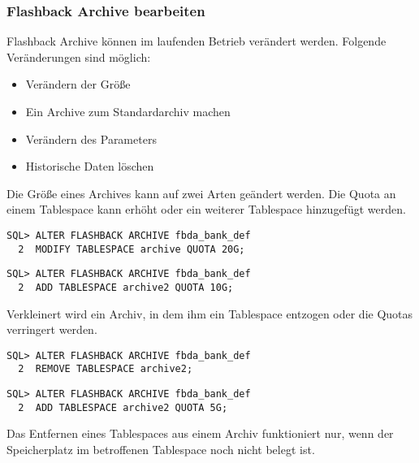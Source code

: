        \subsubsection{Flashback Archive bearbeiten}
          Flashback Archive k\"onnen im laufenden Betrieb ver\"andert werden. Folgende Ver\"anderungen sind m\"oglich:
          \begin{itemize}
            \item Ver\"andern der Gr\"o\ss{}e
            \item Ein Archive zum Standardarchiv machen
            \item Ver\"andern des Parameters 
            \item Historische Daten l\"oschen
          \end{itemize}
          Die Gr\"o\ss{}e eines Archives kann auf zwei Arten ge\"andert werden. Die Quota an einem Tablespace kann erh\"oht oder ein weiterer Tablespace hinzugef\"ugt werden.
          \begin{lstlisting}[caption={Die Quota eines Archives auf 20GB erh\"ohen},label=admin1734,language=oracle_sql]
SQL> ALTER FLASHBACK ARCHIVE fbda_bank_def
  2  MODIFY TABLESPACE archive QUOTA 20G;
          \end{lstlisting}
          \begin{lstlisting}[caption={Dem Archiv einen weiteren Tablespace hinzuf\"ugen},label=admin1735,language=oracle_sql]
SQL> ALTER FLASHBACK ARCHIVE fbda_bank_def
  2  ADD TABLESPACE archive2 QUOTA 10G;
          \end{lstlisting}
          Verkleinert wird ein Archiv, in dem ihm ein Tablespace entzogen oder die Quotas verringert werden.
          \begin{lstlisting}[caption={Einen Tablespace aus dem Archiv entfernen},label=admin1736,language=oracle_sql]
SQL> ALTER FLASHBACK ARCHIVE fbda_bank_def
  2  REMOVE TABLESPACE archive2;
          \end{lstlisting}
          \begin{lstlisting}[caption={Die Quota eines Tablespaces verringern},label=admin1737,language=oracle_sql]
SQL> ALTER FLASHBACK ARCHIVE fbda_bank_def
  2  ADD TABLESPACE archive2 QUOTA 5G;
          \end{lstlisting}
          \begin{merke}
            Das Entfernen eines Tablespaces aus einem Archiv funktioniert nur, wenn der Speicherplatz im betroffenen Tablespace noch nicht belegt ist.
          \end{merke}
